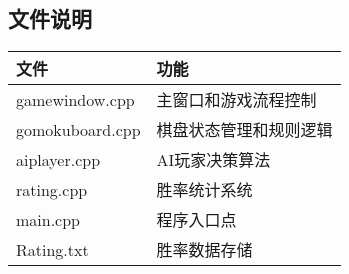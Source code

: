 \documentclass[UTF8]{ctexart}
\begin{document}
\subsection{文件说明}
\begin{tabular}{|l|l|}
\hline
\textbf{文件} & \textbf{功能} \\
\hline
gamewindow.cpp & 主窗口和游戏流程控制 \\
gomokuboard.cpp & 棋盘状态管理和规则逻辑 \\
aiplayer.cpp & AI玩家决策算法 \\
rating.cpp & 胜率统计系统 \\
main.cpp & 程序入口点 \\
Rating.txt & 胜率数据存储 \\
\hline
\end{tabular}
\end{document}
